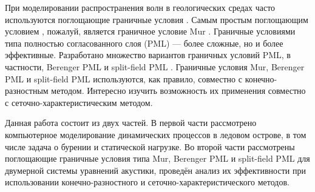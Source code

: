 При моделировании распространения волн в геологических средах часто используются поглощающие граничные условия \cite{seismo_pml,arch_comp_sim}. Самым простым поглощающим условием , пожалуй, является граничное условие Mur \cite{arch_comp_sim}. Граничные условиями типа полностью согласованного слоя (PML) --- более сложные, но и более эффективные. Разработано множество вариантов граничных условий PML, в частности, Berenger PML \cite{berenger} и split-field PML \cite{split_field_pml}. Граничные условия Mur, Berenger PML и split-field PML используются, как правило, совместно с конечно-разностным методом. Интересно  изучить возможность их применения совместно с  сеточно-характеристическим методом.

Данная работа состоит из двух частей. В первой части рассмотрено компьютерное моделирование динамических процессов в ледовом острове, в том числе задача о бурении и статической нагрузке. Во второй части рассмотрены поглощающие граничные условия типа  Mur, Berenger PML и split-field PML для двумерной системы уравнений акустики, проведён анализ их эффективности при использовании конечно-разностного и сеточно-характеристического методов.
